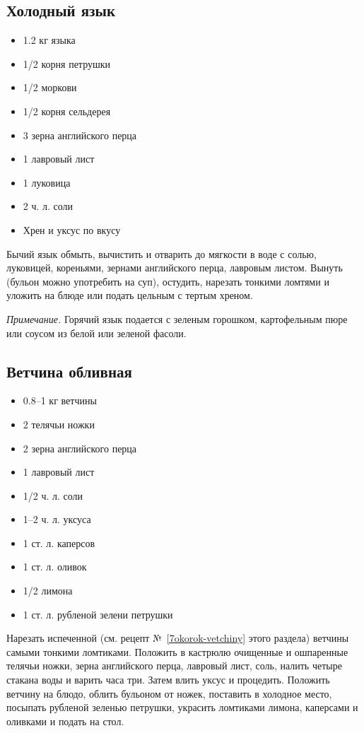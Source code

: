 \subsection{Холодный язык}

\begin{itemize}
	\item 1.2 кг языка 
    \item 1/2 корня петрушки
    \item 1/2 моркови 
    \item 1/2 корня сельдерея
    \item 3 зерна английского перца
    \item 1 лавровый лист 
    \item 1 луковица 
    \item 2 ч. л. соли 
    \item Хрен и уксус по вкусу
\end{itemize}

Бычий язык обмыть, вычистить и отварить до мягкости в воде с солью, луковицей, кореньями, зернами английского перца, лавровым листом. Вынуть (бульон можно употребить на суп), остудить, нарезать тонкими ломтями и уложить на блюде или подать цельным с тертым хреном.

\emph{Примечание.} Горячий язык подается с зеленым горошком, картофельным пюре или соусом из белой или зеленой фасоли.

\subsection{Ветчина обливная}

\begin{itemize}
	\item 0.8–1 кг ветчины 
    \item 2 телячьи ножки 
    \item 2 зерна английского перца
    \item 1 лавровый лист
    \item 1/2 ч. л. соли 
    \item 1–2 ч. л. уксуса 
    \item 1 ст. л. каперсов
    \item 1 ст. л. оливок
    \item 1/2 лимона 
    \item 1 ст. л. рубленой зелени петрушки
\end{itemize}

Нарезать испеченной (см. рецепт №~\ref{7okorok-vetchiny} этого раздела) ветчины самыми тонкими ломтиками. Положить в кастрюлю очищенные и ошпаренные телячьи ножки, зерна английского перца, лавровый лист, соль, налить четыре стакана воды и варить часа три. Затем влить уксус и процедить. Положить ветчину на блюдо, облить бульоном от ножек, поставить в холодное место, посыпать рубленой зеленью петрушки, украсить ломтиками лимона, каперсами и оливками и подать на стол.

